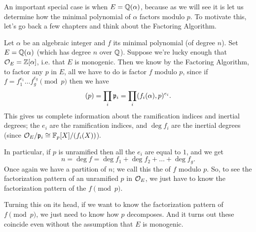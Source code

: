 An important special case is when $E = \mathbb Q(\alpha)$,
because as we will see it is let us determine how the minimal
polynomial of $\alpha$ factors modulo $p$.
To motivate this, let's go back a few chapters
and think about the Factoring Algorithm.

Let $\alpha$ be an algebraic integer and $f$ its minimal polynomial (of degree $n$).
Set $E = \mathbb Q(\alpha)$ (which has degree $n$ over $\mathbb Q$).
Suppose we're lucky enough that $\mathcal O_E = \mathbb Z[\alpha]$,
i.e. that $E$ is monogenic.
Then we know by the Factoring Algorithm,
to factor any $p$ in $E$, all we have to do is factor $f$ modulo $p$,
since if $f = f_1^{e_1} \dots f_g^{e_g} \pmod p$ then we have
\[ (p) = \prod_i \mathfrak p_i = \prod_i (f_i(\alpha), p)^{e_i}. \]
This gives us complete information about the ramification indices and inertial degrees;
the $e_i$ are the ramification indices, and $\deg f_i$ are the inertial degrees
(since $\mathcal O_E / \mathfrak p_i \cong \mathbb F_p[X] / (f_i(X))$).

In particular, if $p$ is unramified then all the $e_i$ are equal to $1$, and we get
\[ n = \deg f = \deg f_1 + \deg f_2 + \dots + \deg f_g. \]
Once again we have a partition of $n$;
we call this the  of $f$ modulo $p$.
So, to see the factorization pattern of an unramified $p$ in $\mathcal O_E$,
we just have to know the factorization pattern of the $f \pmod p$.

Turning this on its head, if we want to know the factorization pattern of $f \pmod p$,
we just need to know how $p$ decomposes.
And it turns out these coincide even without the assumption that $E$ is monogenic.

